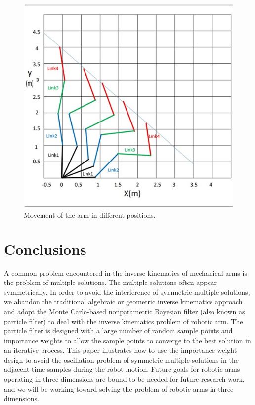 \documentclass[journal,article,submit,pdftex,moreauthors]{Definitions/mdpi}
\begin{document}
\begin{figure}[H]
\includegraphics[width=10.5 cm]{Definitions/fig7}
\caption{Movement of the arm in different positions. \label{fig7}}
\end{figure}   


\section{Conclusions}

A common problem encountered in the inverse kinematics of mechanical arms is the problem of multiple solutions. The multiple solutions often appear symmetrically. In order to avoid the interference of symmetric multiple solutions, we abandon the traditional algebraic or geometric inverse kinematics approach and adopt the Monte Carlo-based nonparametric Bayesian filter (also known as particle filter) to deal with the inverse kinematics problem of robotic arm. The particle filter is designed with a large number of random sample points and importance weights to allow the sample points to converge to the best solution in an iterative process. This paper illustrates how to use the importance weight design to avoid the oscillation problem of symmetric multiple solutions in the adjacent time samples during the robot motion.
Future goals for robotic arms operating in three dimensions are bound to be needed for future research work, and we will be working toward solving the problem of robotic arms in three dimensions.
\end{document}

